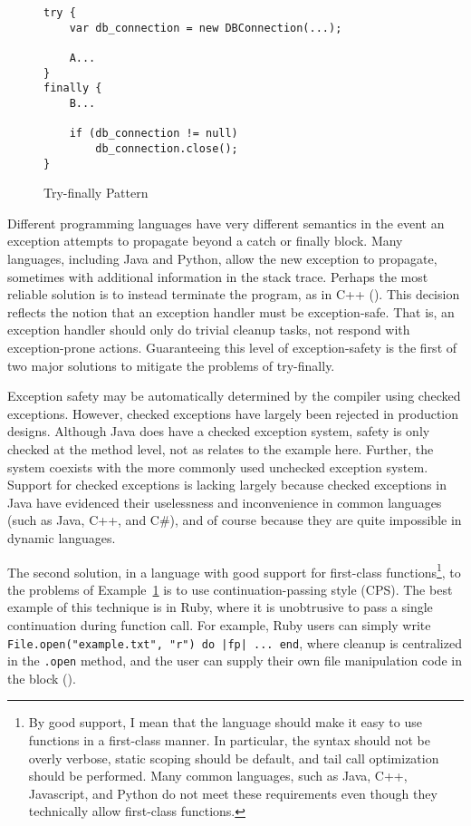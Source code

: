 \documentclass[11pt]{article}
\begin{document}
\begin{figure}[H]
\caption{Try-finally Pattern}
\label{tryPattern}
\begin{verbatim}
try {  
    var db_connection = new DBConnection(...);

    A...
}
finally {
    B...

    if (db_connection != null)
        db_connection.close();
}
\end{verbatim}
\end{figure}

\newpage %
Different programming languages have very different semantics in the event an exception attempts to propagate beyond a catch or finally block.
Many languages, including Java and Python, allow the new exception to propagate, sometimes with additional information in the stack trace.
Perhaps the most reliable solution is to instead terminate the program, as in C++ (\cite{evolutionCplusplus}).
This decision reflects the notion that an exception handler must be exception-safe.
That is, an exception handler should only do trivial cleanup tasks, not respond with exception-prone actions.
Guaranteeing this level of exception-safety is the first of two major solutions to mitigate the problems of try-finally.

Exception safety may be automatically determined by the compiler using checked exceptions.
However, checked exceptions have largely been rejected in production designs.
Although Java does have a checked exception system, safety is only checked at the method level, not as relates to the example here.
Further, the system coexists with the more commonly used unchecked exception system.
Support for checked exceptions is lacking largely because checked exceptions in Java have evidenced their uselessness and inconvenience in common languages (such as Java, C++, and C\#), and of course because they are quite impossible in dynamic languages.

The second solution, in a language with good support for first-class functions\footnote{By good support, I mean that the language should make it easy to use functions in a first-class manner. In particular, the syntax should not be overly verbose, static scoping should be default, and tail call optimization should be performed. Many common languages, such as Java, C++, Javascript, and Python do not meet these requirements even though they technically allow first-class functions.}, to the problems of Example~\ref{tryPattern} is to use continuation-passing style (CPS).
The best example of this technique is in Ruby, where it is unobtrusive to pass a single continuation during function call.
For example, Ruby users can simply write \texttt{File.open("example.txt", "r") do |fp| ... end}, where cleanup is centralized in the \texttt{.open} method, and the user can supply their own file manipulation code in the block (\cite{programmingRuby}).
\end{document}
